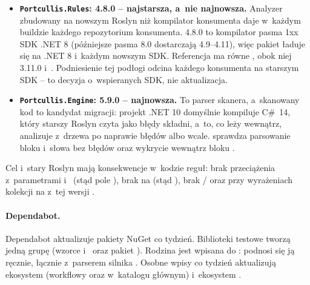 \begin{itemize}[leftmargin=*]
  \item \textbf{\texttt{Portcullis.Rules}: 4.8.0 -- najstarsza, a~nie najnowsza.} Analyzer
        zbudowany na nowszym Roslyn niż kompilator konsumenta daje 
        w~każdym buildzie każdego repozytorium konsumenta. 4.8.0 to kompilator pasma 1xx
        SDK .NET 8 (późniejsze pasma 8.0 dostarczają 4.9--4.11), więc pakiet ładuje się na
        .NET 8 i~każdym nowszym SDK. Referencja ma  równe
        , obok niej
         3.11.0 i~.
        Podniesienie tej podłogi odcina każdego konsumenta na starszym SDK -- to decyzja
        o~wspieranych SDK, nie aktualizacja.
  \item \textbf{\texttt{Portcullis.Engine}: 5.9.0 -- najnowsza.} To parser skanera,
        a~skanowany kod to kandydat migracji: projekt .NET 10 domyślnie kompiluje C\#~14,
        który starszy Roslyn czyta jako błędy składni, a~to, co leży wewnątrz, analizuje
        z~drzewa po naprawie błędów albo wcale. 
        sprawdza parsowanie bloku  i~słowa  bez błędów
        oraz wykrycie  wewnątrz bloku .
\end{itemize}

Cel  i~stary Roslyn mają konsekwencje w~kodzie reguł: brak
przeciążenia  z~parametrami 
i~ (stąd pole ), brak \repopath{[NotNullWhen]} na 
(stąd ), brak /
oraz  przy wyrażeniach kolekcji na  z~tej wersji
.

\paragraph{Dependabot.} Dependabot aktualizuje pakiety NuGet co tydzień. Biblioteki testowe
tworzą jedną grupę  (wzorce  i~ oraz
pakiet ). Rodzina  jest
wpisana do : podnosi się ją ręcznie, łącznie z~parserem silnika
. Osobne wpisy co tydzień aktualizują ekosystem
 (workflowy oraz  w~katalogu głównym)
i~ekosystem .

